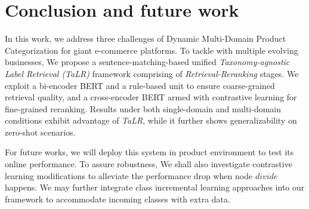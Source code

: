 \section{Conclusion and future work}
In this work, we address three challenges of Dynamic Multi-Domain Product Categorization for giant e-commerce platforms. 
To tackle with multiple evolving businesses,
We propose a sentence-matching-based unified \textit{Taxonomy-agnostic Label Retrieval (TaLR)} framework comprising of \textit{Retrieval-Reranking} stages. 
We exploit a bi-encoder BERT and a rule-based unit to ensure coarse-grained retrieval quality, and a cross-encoder BERT armed with contrastive learning for fine-grained reranking. 
Results under both single-domain and multi-domain conditions exhibit advantage of \textit{TaLR}, while it further shows generalizability on zero-shot scenarios.

For future works, we will deploy this system in product environment to test its online performance. To assure robustness, We shall also investigate contrastive learning modifications to alleviate the performance drop when node $divide$ happens. 
We may further integrate class incremental learning \cite{rebuffi2017icarl} approaches into our framework to accommodate incoming classes with extra data. 